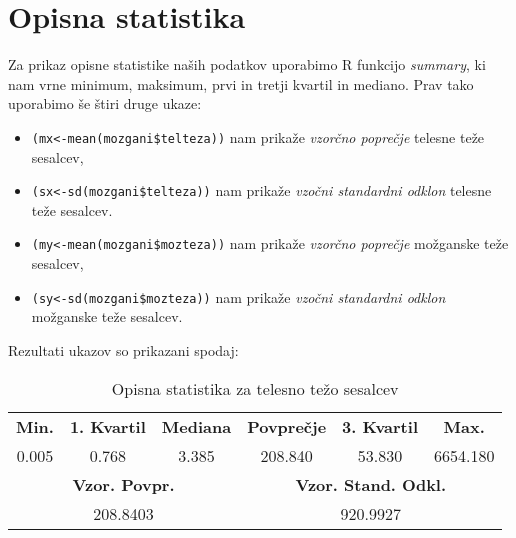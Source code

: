 \section{Opisna statistika}


Za prikaz opisne statistike naših podatkov uporabimo R funkcijo \emph{summary}, ki nam vrne minimum, maksimum,
prvi in tretji kvartil in mediano.
Prav tako uporabimo še štiri druge ukaze:

\begin{itemize}
    \item \verb|(mx<-mean(mozgani$telteza))|\label{en:mx} nam prikaže \emph{vzorčno poprečje} telesne teže sesalcev,
    \item \verb|(sx<-sd(mozgani$telteza))|\label{en:sx} nam prikaže \emph{vzočni standardni odklon} telesne teže sesalcev.
    \item \verb|(my<-mean(mozgani$mozteza))|\label{en:my} nam prikaže \emph{vzorčno poprečje} možganske teže sesalcev,
    \item \verb|(sy<-sd(mozgani$mozteza))|\label{en:sy} nam prikaže \emph{vzočni standardni odklon} možganske teže sesalcev.
\end{itemize}

\noindent
Rezultati ukazov so prikazani spodaj:

\begin{table}[h]
    \centering
    \begin{tabular}{|c|c|c|c|c|c|}
    \hline
    \textbf{Min.} & \textbf{1. Kvartil} & \textbf{Mediana} & \textbf{Povprečje} & \textbf{3. Kvartil} & \textbf{Max.} \\
    0.005 & 0.768 & 3.385 & 208.840 & 53.830 & 6654.180 \\ \hline
    \multicolumn{3}{|c|}{\textbf{Vzor. Povpr.}} & \multicolumn{3}{c|}{\textbf{Vzor. Stand. Odkl.}} \\
    \multicolumn{3}{|c|}{208.8403} & \multicolumn{3}{c|}{920.9927} \\ \hline
    \end{tabular}
    \caption{Opisna statistika za telesno težo sesalcev}
    \label{tab:telteza}
    \end{table}

